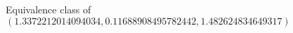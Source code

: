 \documentclass[preview]{standalone}
\begin{document}
\begin{center}
Equivalence class of $(1.3372212014094034, 0.11688908495782442, 1.482624834649317)$
\end{center}
\end{document}
